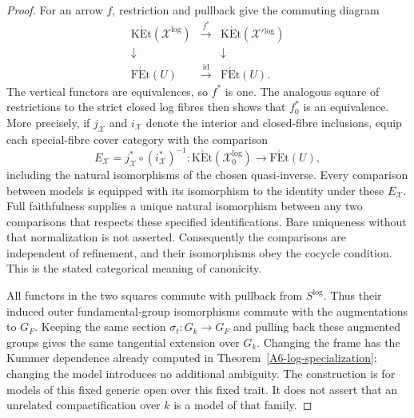 \begin{proof}
For an arrow $f$, restriction and pullback give the commuting diagram
\[
 \begin{array}{ccc}
 \operatorname{K\acute Et}(\mathcal X^{\log})&
   \xrightarrow{\ f^*\ }&
 \operatorname{K\acute Et}(\mathcal X'{}^{\log})\\
 \downarrow&&\downarrow\\
 \operatorname{F\acute Et}(U)&\xrightarrow{\ \operatorname{id}\ }&
 \operatorname{F\acute Et}(U).
 \end{array}
\]
The vertical functors are equivalences, so $f^*$ is one. The analogous
square of restrictions to the strict closed log fibres then shows that
$f_0^*$ is an equivalence. More precisely, if $j_{\mathcal X}$ and
$i_{\mathcal X}$ denote the interior and closed-fibre inclusions, equip
each special-fibre cover category with the comparison
\[
 E_{\mathcal X}=j_{\mathcal X}^*\circ(i_{\mathcal X}^*)^{-1}
       :\operatorname{K\acute Et}(\mathcal X_0^{\log})
        \longrightarrow\operatorname{F\acute Et}(U),
\]
including the natural isomorphisms of the chosen quasi-inverse.
Every comparison between models is equipped with its isomorphism to
the identity under these $E_{\mathcal X}$. Full faithfulness supplies
a unique natural isomorphism between any two comparisons that respects
these specified identifications. Bare uniqueness without that
normalization is not asserted. Consequently the comparisons
are independent of refinement, and their isomorphisms obey the cocycle
condition. This is the stated categorical meaning of canonicity.

All functors in the two squares commute with pullback from $S^{\log}$.
Thus their induced outer fundamental-group isomorphisms commute with
the augmentations to $G_F$. Keeping the same section
$\sigma_t:G_k\to G_F$ and pulling back these augmented groups gives
the same tangential extension over $G_k$. Changing the frame has the
Kummer dependence already computed in Theorem~\ref{A6-log-specialization};
changing the model introduces no additional ambiguity. The construction
is for models of this fixed generic open over this fixed trait. It
does not assert that an unrelated compactification over $k$ is a model
of that family.
\end{proof}

